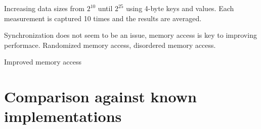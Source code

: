 Increasing data sizes from $2^10$ until $2^25$ using 4-byte keys and values. Each measurement is captured 10 times and the results are averaged.

Synchronization does not seem to be an issue, memory access is key to improving performace. Randomized memory access, disordered memory access.

 Improved memory access

\section{Comparison against known implementations}